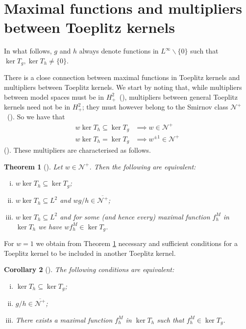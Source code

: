 \documentclass[12pt]{elsarticle}
\numberwithin{equation}{section}
\theoremstyle{plain}
\newtheorem{thm}{Theorem}[section]
\newtheorem{cor}[thm]{Corollary}
\newcommand{\ds}{\displaystyle}
\newcommand{\Hp}{\ensuremath{H^2_+}}
\newcommand{\Linf}{\ensuremath{L^\infty}}
\newcommand{\NN}{\ensuremath{\mathcal{N}^+}}
\newcommand{\ol}[1]{\ensuremath{\overline{#1}}}
\newcommand{\bs}{\backslash}
\newcommand{\zero}{\ensuremath{\{0\}}}
\renewcommand{\subset}{\subseteq}
\begin{document}

\section{Maximal functions and multipliers between Toeplitz kernels}
\label{sec:Maximal_functions_and_multipliers_between_Toeplitz_kernels}

In what follows, $g$ and $h$ always denote functions in $\Linf\bs\zero$ such that $\ker T_g, \ker T_h \neq\zero$.

There is a close connection between maximal functions in Toeplitz kernels and multipliers between Toeplitz kernels.
We start by noting that, while multipliers between model spaces must be in \Hp\ (\cite[Corollary 4]{Cro94}), multipliers between general Toeplitz kernels need not be in \Hp; they must however belong to the Smirnov class \NN\ (\cite{Ni02_vol1}).
So we have that
\begin{align*}
w \ker T_h \subset \ker T_g & \implies w \in \NN \\
w \ker T_h = \ker T_g & \implies w^{\pm 1} \in \NN
\end{align*}
(\cite[Remark 2.4]{CP18_multipliers}).
These multipliers are characterised as follows.

\begin{thm}[{\cite[Thm. 2.5]{CP18_multipliers}}]
\label{thm:multiplicadores_into_kernels}
Let $w\in\NN$.
Then the following are equivalent:
\begin{enumerate}[(i)]
\item $w \ker T_h \subset \ker T_g$;

\item $w \ker T_h \subset L^2$ and $\ds w g/h \in \ol\NN$;

\item $w \ker T_h \subset L^2$ and for some (and hence every) maximal function $\ds f^M_h$ in $\ker T_h$ we have $\ds w f^M_h \in \ker T_g$.
\end{enumerate}

\end{thm}


For $w=1$ we obtain from Theorem \ref{thm:multiplicadores_into_kernels} necessary and sufficient conditions for a Toeplitz kernel to be included in another Toeplitz kernel.

\begin{cor}[{\cite[Prop. 2.16]{CP18_multipliers}}]
\label{cor:kernel.subset.of.another.kernel}
The following conditions are equivalent:
\begin{enumerate}[(i)]
\item $\ker T_h \subset \ker T_g$;

\item $g/h \in \ol\NN$;

\item There exists a maximal function $f^M_h$ in $\ker T_h$ such that $f^M_h \in \ker T_g$.
\end{enumerate}

\end{cor}
\end{document}
